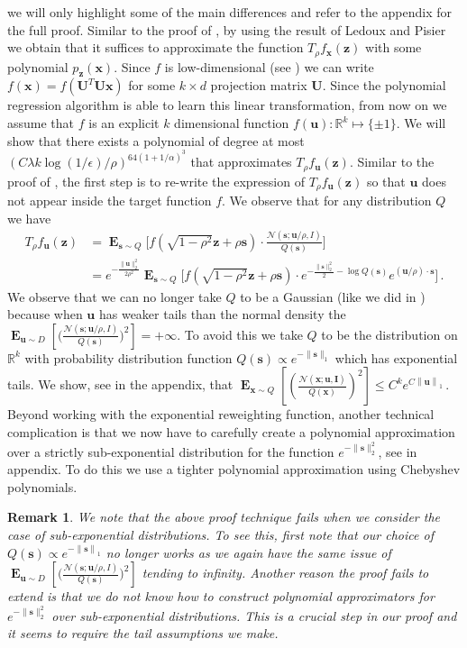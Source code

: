 \documentclass[10pt,a4paper]{article}
\newtheorem{remark}{Remark}[section]
\newcommand\twonorm[1]{\|#1\|_2}
\newcommand\norm[1]{\left\| #1 \right\|}
\renewcommand\vec[1]{\mathbf{#1}}
\DeclareMathOperator*{\E}{\mathbf{E}}
\newcommand{\R}{\mathbb{R}}
\newcommand{\1}{\Ind}
\newcommand{\x}{\vec x}
\newcommand{\vu}{\vec u}
\newcommand{\z}{\vec z}
\newcommand{\Gauss}{\mathcal{N}}
\begin{document}
we will only highlight some of the main differences and refer to the appendix for the 
full proof. Similar to the proof of , by using the result of 
Ledoux and Pisier  we obtain that it suffices to approximate the function 
$T_\rho f_\x(\z)$ with some polynomial $p_\z(\x)$.  Since $f$ is low-dimensional (see ) we can write $f(\x) = f(\vec U^T \vec U \x)$ for some $k \times d$ 
projection matrix $\vec U$. Since the polynomial regression algorithm is able to learn this linear
transformation, from now on we assume that $f$ is an explicit $k$ dimensional function 
$f(\vu):\R^k \mapsto \{\pm 1\}$.  We will show that there exists a polynomial of degree 
at most $\left(C\lambda k\log (1/\epsilon)/\rho\right)^{64(1+1/\alpha)^3}$ that approximates 
$T_\rho f_\vu(\z)$. Similar to the proof of , 
the first step is to re-write the expression of $T_\rho f_\vu(\z)$ so that $\vu$ does not appear inside the target function $f$.  We observe that for any distribution $Q$ we have
    \begin{align*}
        T_{\rho}f_{\vu}(\z) &=\E_{\vec s\sim Q}\biggl[f(\sqrt{1-\rho^2}\z+\rho\vec s)\cdot \frac{\Gauss(\vec s;\vu/\rho,I)}{Q(\vec s)}\biggr]\\
        &=e^{-\frac{\twonorm{\vu}^2}{2\rho^2}}\E_{\vec s\sim Q}\biggl[f(\sqrt{1-\rho^2}\z+\rho\vec s)\cdot e^{-\frac{\twonorm{\vec s}^2}{2}-\log Q(\vec s)}e^{ (\vu/\rho)\cdot\vec s}\biggr] \,.
    \end{align*}
    We observe that we can no longer take $Q$ to be a Gaussian (like we did in ) because when $\vec u$ has weaker tails than the normal 
    density the 
    $\E_{\vec u\sim D}[\big(\frac{\Gauss(\vec s;\vu/\rho,I)}{Q(\vec s)} \big)^2] = +\infty$.
    To avoid this we take $Q$ to be the distribution on $\R^k$ with probability distribution 
    function $Q(\vec s)\propto e^{-\|\vec s\|_1}$ which has exponential tails.  We show, see  in the appendix, that
   $ \E_{\x\sim Q}[(\frac{\mathcal{N}(\x; \vu, \vec I)}{Q(\x)})^2] \leq  C^ke^{C\norm{\vu}_1}\,. $
   Beyond working with the exponential reweighting function, another technical complication is that 
   we now have to carefully create a polynomial approximation over a strictly sub-exponential 
   distribution for the function $e^{-\|\vec s\|_2^2}$, see  in appendix.  To do this we use a tighter polynomial approximation using Chebyshev polynomials.
\begin{remark}
\label{rem:tail_assumption}
    We note that the above proof technique fails when we consider the case of sub-exponential distributions. To see this, first note that our choice of $Q(\vec{s})\propto e^{-\norm{\vec{s}}_1}$ no longer works as we again have the same issue of $\E_{\vec u\sim D}[\big(\frac{\Gauss(\vec s;\vu/\rho,I)}{Q(\vec s)} \big)^2]$ tending to infinity. Another reason the proof fails to extend is that we do not know how to construct polynomial approximators for $e^{-\twonorm{\vec{s}}^2}$ over sub-exponential distributions. This is a crucial step in our proof and it seems to require the tail assumptions we make.
\end{remark}
\end{document}
